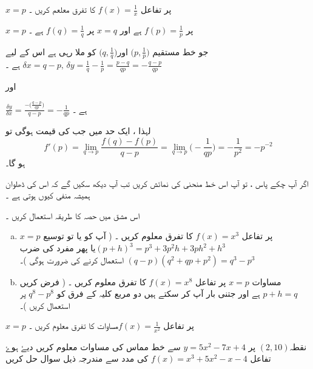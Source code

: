 
\(x=p\)  پر تفاعل \(f(x)=\frac{1}{x}\) کا تفرق معلعم کریں ۔ 

\(x=p\) پر \(f(p)=\frac{1}{p}\) ہے اور \(x=q\) پر \(f(q)=\frac{1}{q}\) ہے ۔

جو خط مستقیم \(\big( p,\frac{1}{p} \big)\) اور\(\big( q,\frac{1}{q} \big)\) کو ملا رہی ہے اس کے لیے \(\delta x=q-p, \, \delta y=\frac{1}{q}-\frac{1}{p}=\frac{p-q}{qp}=-\frac{q-p}{qp}\) ہے ۔

اور 

\(\frac{\delta y}{\delta x}=\frac{-\big( \frac{q-p}{qp}\big)}{q-p}=-\frac{1}{qp}\) ہے ۔ 

لہذا ، ایک حد میں جب  کی قیمت ہوگی تو \[f'(p)=\lim_{q \to p} \frac{f(q)-f(p)}{q-p}=\lim_{q \to p} \big( -\frac{1}{qp}\big)=-\frac{1}{p^2}=-p^{-2}\] ہو گا۔ 

اگر آپ چکے پاس ، تو آپ اس خط منحنی کی نمائش کریں تب آپ دیکھ سکیں گے کہ اس کی ڈھلوان ہمیشہ منفی کیوں ہوتی ہے ۔ 


اس مشق میں حصہ    کا طریقہ استعمال کریں ۔
\begin{enumerate}[a.]
\item  
\(x=p\) پر تفاعل \(f(x)=x^3\) کا تفرق معلوم کریں ۔ ( آپ کو یا تو توسیع \((p+h)^3=p^3+3p^2h+3ph^2+h^3\)یا پھر مفرد کی ضرب \((q-p)(q^2+qp+p^2)=q^3-p^3\)  استعمال کرنے کی ضرورت ہوگی )۔
\item 
مساوات \(x=p\) پر تفاعل \(f(x)=x^8\) کا تفرق معلوم کریں ۔ ( فرض کریں \(p+h=q\) ہے اور جتنی بار آپ کر سکتے ہیں دو مربع  کلیہ کے فرق کو   \(q^8-p^8\) 
   پر استعمال کریں )۔
 \end{enumerate}



\(x=p\) پر تفاعل \(f(x)=\frac{1}{x^2}\)مساوات 
 کا تفرق معلوم کریں ۔

 نقطہ\( (2,10)  \) پر  \(y=5x^2-7x+4\) سے خط مماس کی مساوات معلوم کریں  
  دیۓ ہوۓ تفاعل \(f(x)=x^3+5x^2-x-4\) کی مدد سے مندرجہ ذیل سوال حل کریں 

